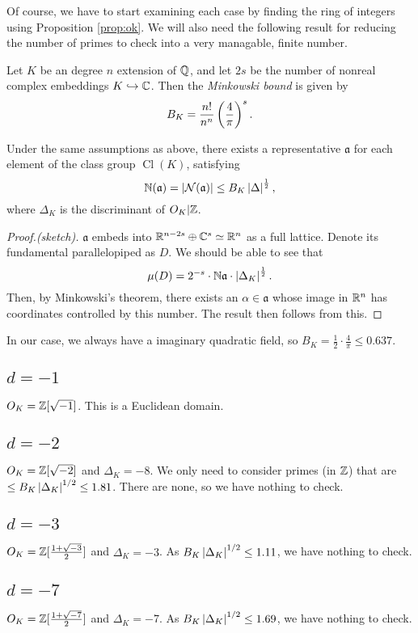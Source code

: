 \documentclass{article}
\newcommand{\csd}[1]{\subsection{\texorpdfstring{$d=-#1$}{d=-#1}}\indent}
\begin{document}
Of course, we have to start examining each case by finding the ring of integers using Proposition \ref{prop:ok}. We will also need the following result for reducing the number of primes to check into a very managable, finite number.

\begin{definition}
    Let $K$ be an degree $n$ extension of $\mathbb{Q}$, and let $2s$ be the number of nonreal complex embeddings $K\hookrightarrow\mathbb{C}$. Then the \emph{Minkowski bound} is given by
    \[
        B_K = \frac{n!}{n^n}\left(\frac{4}{\pi}\right)^s.
    \]
\end{definition}

\begin{theorem}
    Under the same assumptions as above, there exists a representative $\mathfrak{a}$ for each element of the class group $\operatorname{Cl}(K)$, satisfying
    \[
        \mathbb{N}(\mathfrak{a})=\left\vert\mathcal{N}(\mathfrak{a})\right\vert\leq B_K\left\vert\Delta\right\vert^{\frac{1}{2}},
    \]
    where $\Delta_K$ is the discriminant of $O_K\vert\mathbb{Z}$. 
\end{theorem}

\begin{proof}[Proof.(sketch)]
    $\mathfrak{a}$ embeds into $\mathbb{R}^{n-2s}\oplus\mathbb{C}^{s}\simeq\mathbb{R}^{n}$ as a full lattice. Denote its fundamental parallelopiped as $D$. We should be able to see that
    \[
        \mu(D) = 2^{-s} \cdot \mathbb{N}\mathfrak{a} \cdot \left\vert\Delta_K\right\vert^{\frac{1}{2}}.
    \]
    Then, by Minkowski's theorem, there exists an $\alpha\in\mathfrak{a}$ whose image in $\mathbb{R}^{n}$ has coordinates controlled by this number. The result then follows from this.
\end{proof}

In our case, we always have a imaginary quadratic field, so $B_K=\frac{1}{2}\cdot\frac{4}{\pi}\leq 0.637$.

\csd{1}

$O_K=\mathbb{Z}[\sqrt{-1}]$.
This is a Euclidean domain.

\csd{2}

$O_K=\mathbb{Z}[\sqrt{-2}]$ and $\Delta_K=-8$. We only need to consider primes (in $\mathbb{Z}$) that are $\leq B_K\left\vert\Delta_K\right\vert^{1/2}\leq 1.81$. There are none, so we have nothing to check.

\csd{3}

$O_K=\mathbb{Z}[\frac{1+\sqrt{-3}}{2}]$ and $\Delta_K=-3$. As $B_K\left\vert\Delta_K\right\vert^{1/2}\leq 1.11$, we have nothing to check.

\csd{7}

$O_K=\mathbb{Z}[\frac{1+\sqrt{-7}}{2}]$ and $\Delta_K=-7$. As $B_K\left\vert\Delta_K\right\vert^{1/2}\leq 1.69$, we have nothing to check.
\end{document}
